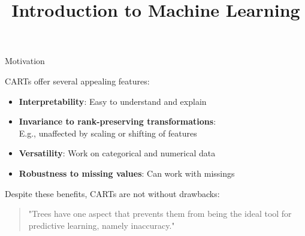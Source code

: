 \documentclass[11pt,compress,t,notes=noshow, xcolor=table]{beamer}
\title{Introduction to Machine Learning}
\begin{document}

\begin{frame2}{Motivation}

CARTs offer several appealing features:

\begin{itemize}
  \item \textbf{Interpretability}: Easy to understand and explain
  \item \textbf{Invariance to rank-preserving transformations}: \\
    E.g., unaffected by scaling or shifting of features
  \item \textbf{Versatility}: Work on categorical and numerical data
  \item \textbf{Robustness to missing values}: Can work with missings
\end{itemize}

\lz \lz

Despite these benefits, CARTs are not without drawbacks:

\lz

\begin{quotation}
"Trees have one aspect that prevents them from being the ideal tool for predictive learning, namely inaccuracy."
\end{quotation}

\end{frame2}
\end{document}
